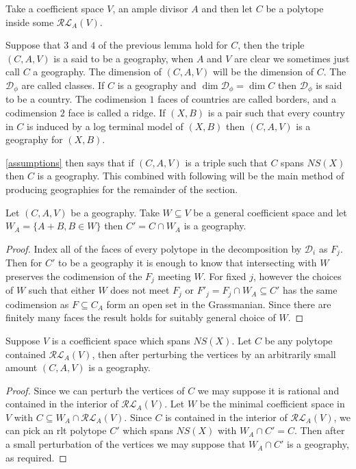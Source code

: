 	\begin{definition}
		Take a coefficient space $V$, an ample divisor $A$ and then let $C$ be a polytope inside some $\mathcal{RL}_{A}(V)$.
		
		Suppose that $3$ and $4$ of the previous lemma hold for $C$, then the triple $(C,A,V)$ is a said to be a geography, when $A$ and $V$ are clear we sometimes just call $C$ a geography. The dimension of $(C,A,V)$ will be the dimension of $C$.
		The $\mathcal{D}_{\phi}$ are called classes.
		If $C$ is a geography and $\dim \mathcal{D_{\phi}}= \dim C$ then $\mathcal{D}_{\phi}$ is said to be a country. The codimension $1$ faces of countries are called borders, and a codimension $2$ face is called a ridge.
		If $(X,B)$ is a pair such that every country in $C$ is induced by a log terminal model of $(X,B)$ then $(C,A,V)$ is a geography for $(X,B)$.
	\end{definition}

	\autoref{assumptions} then says that if $(C,A,V)$ is a triple such that $C$ spans $NS(X)$ then $C$ is a geography.
	This combined with following will be the main method of producing geographies for the remainder of the section.
	
	\begin{lemma}
		Let $(C,A,V)$ be a geography. Take $W \subseteq V$ be a general coefficient space and let $W_{A}=\{A+B, B \in W\}$ then $C'=C \cap W_{A}$ is a geography. 
	\end{lemma}
	\begin{proof}
		Index all of the faces of every polytope in the decomposition by $\mathcal{D}_{i}$ as $F_{j}$. Then for $C'$ to be a geography it is enough to know that intersecting with $W$ preserves the codimension of the $F_{j}$ meeting $W$. For fixed $j$, however the choices of $W$ such that either $W$ does not meet $F_{j}$ or $F'_{j}=F_{j} \cap W_{A} \subseteq C'$ has the same codimension as $F \subseteq C_{A}$ form an open set in the Grassmanian. Since there are finitely many faces the result holds for suitably general choice of $W$.
	\end{proof}

	
	\begin{lemma}
		Suppose $V$ is a coefficient space which spans $NS(X)$. Let $C$ be any polytope contained $\mathcal{RL}_{A}(V)$, then after perturbing the vertices by an arbitrarily small amount $(C,A,V)$ is a geography.
	\end{lemma}
	\begin{proof}
		Since we can perturb the vertices of $C$ we may suppose it is rational and contained in the interior of $\mathcal{RL}_{A}(V)$. Let $W$ be the minimal coefficient space in $V$ with $C \subseteq W_{A}\cap \mathcal{RL}_{A}(V)$. Since $C$ is contained in the interior of $\mathcal{RL}_{A}(V)$, we can pick an rlt polytope $C'$ which spans $NS(X)$ with $W_{A}\cap C'=C$. Then after a small perturbation of the vertices we may suppose that $W_{A}\cap C'$ is a geography, as required.
	\end{proof}

